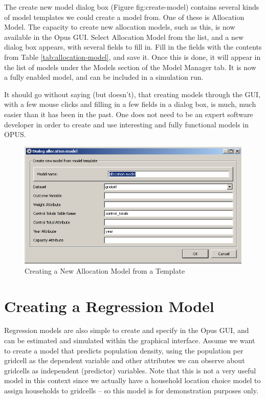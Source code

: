 The create new model dialog box (Figure {fig:create-model}) contains several kinds of model templates we could create a model from. One of these is Allocation Model. The capacity to create new allocation models, such as this, is now available in the Opus GUI. Select Allocation Model from the list, and a new dialog box appears, with several fields to fill in.  Fill in the fields with the contents from Table \ref{tab:allocation-model}, and save it.  Once this is done, it will appear in the list of models under the Models section of the Model Manager tab.  It is now a fully enabled model, and can be included in a simulation run.

It should go without saying (but doesn't), that creating models through the GUI, with a few mouse clicks and filling in a few fields in a dialog box, is much, much easier than it has been in the past. One does not need to be an expert software developer in order to create and use interesting and fully functional models in OPUS.


\begin{figure}[htp]
\begin{center}
\includegraphics[scale=0.6]{part-gui/images/model-manager-create-allocation-model-from-template.png}
\end{center}
\caption{Creating a New Allocation Model from a Template}
\label{fig:create-allocation-model}
\end{figure}

\section{Creating a Regression Model}

Regression models are also simple to create and specify in the Opus GUI, and can be estimated and simulated within the graphical interface.    Assume we want to create a model that predicts population density, using the population per gridcell as the dependent variable and other attributes we can observe about gridcells as independent (predictor) variables.  Note that this is not a very useful model in this context since we actually have a household location choice model to assign households to gridcells -- so this model is for demonstration purposes only.

